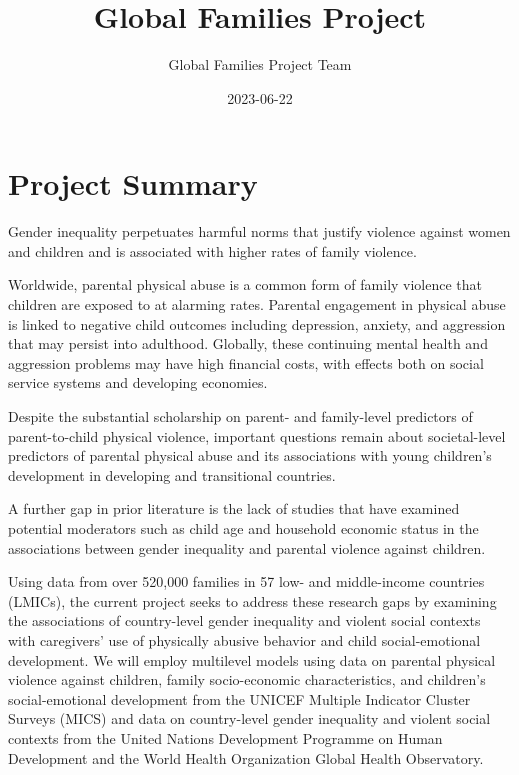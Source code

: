 \documentclass[
  letterpaper,
  DIV=11,
  numbers=noendperiod]{scrreprt}
\title{Global Families Project}
\author{Global Families Project Team}
\date{2023-06-22}
\renewcommand*\contentsname{Table of contents}
\newcommand\contentsname{Table of contents}
\begin{document}
\maketitle
\ifdefined\Shaded\renewenvironment{Shaded}{\begin{tcolorbox}[borderline west={3pt}{0pt}{shadecolor}, sharp corners, interior hidden, enhanced, frame hidden, breakable, boxrule=0pt]}{\end{tcolorbox}}\fi

\renewcommand*\contentsname{Table of contents}
{
\hypersetup{linkcolor=}
\setcounter{tocdepth}{2}
\tableofcontents
}

\hypertarget{project-summary}{%
\chapter{Project Summary}\label{project-summary}}

Gender inequality perpetuates harmful norms that justify violence
against women and children and is associated with higher rates of family
violence.

Worldwide, parental physical abuse is a common form of family violence
that children are exposed to at alarming rates. Parental engagement in
physical abuse is linked to negative child outcomes including
depression, anxiety, and aggression that may persist into adulthood.
Globally, these continuing mental health and aggression problems may
have high financial costs, with effects both on social service systems
and developing economies.

Despite the substantial scholarship on parent- and family-level
predictors of parent-to-child physical violence, important questions
remain about societal-level predictors of parental physical abuse and
its associations with young children's development in developing and
transitional countries.

A further gap in prior literature is the lack of studies that have
examined potential moderators such as child age and household economic
status in the associations between gender inequality and parental
violence against children.

Using data from over 520,000 families in 57 low- and middle-income
countries (LMICs), the current project seeks to address these research
gaps by examining the associations of country-level gender inequality
and violent social contexts with caregivers' use of physically abusive
behavior and child social-emotional development. We will employ
multilevel models using data on parental physical violence against
children, family socio-economic characteristics, and children's
social-emotional development from the UNICEF Multiple Indicator Cluster
Surveys (MICS) and data on country-level gender inequality and violent
social contexts from the United Nations Development Programme on Human
Development and the World Health Organization Global Health Observatory.
\end{document}
